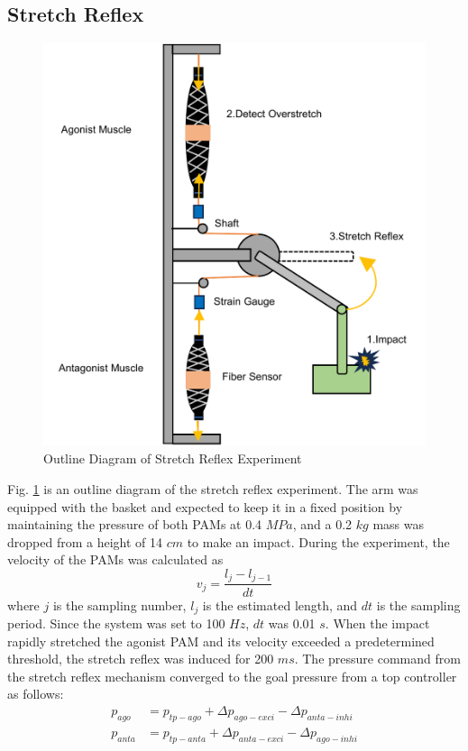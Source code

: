 \subsection{Stretch Reflex}
\begin{figure}[t]
    \centering
    \includegraphics[width=0.7\columnwidth]{fig/reflex_experiment.pdf}
    \caption{Outline Diagram of Stretch Reflex Experiment}
    \label{fig:reflex_equipment}
 \end{figure}
Fig. \ref{fig:reflex_equipment} is an outline diagram of the stretch reflex experiment.
The arm was equipped with the basket and expected to keep it in a fixed position by maintaining the pressure of both PAMs at 0.4 $\si{MPa}$, and a 0.2 $\si{kg}$ mass was dropped from a height of 14 $\si{cm}$ to make an impact. During the experiment, the velocity of the PAMs was calculated as 
\begin{equation}
    \label{eq:velocity}
    v_j = \frac{l_j -l_{j-1}}{dt}
\end{equation}
where $j$ is the sampling number, $l_j$ is the estimated length, and $dt$ is the sampling period.
Since the system was set to 100 $\si{Hz}$, $dt$ was 0.01 $\si{s}$.
When the impact rapidly stretched the agonist PAM and its velocity exceeded a predetermined threshold, the stretch reflex was induced for 200 $\si{ms}$. The pressure command from the stretch reflex mechanism converged to the goal pressure from a top controller as follows:
\begin{align}
    \label{eq:command_pressure}
    p_{ago} &= p_{tp - ago} + \Delta p_{ago - exci} - \Delta p_{anta - inhi} \\
    p_{anta} &= p_{tp - anta} + \Delta p_{anta - exci} - \Delta p_{ago - inhi}
\end{align}
